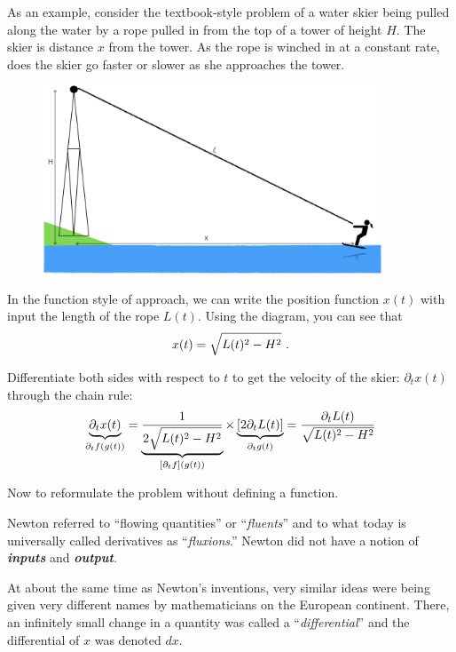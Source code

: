 \documentclass[
  letterpaper,
  DIV=11,
  numbers=noendperiod,
  oneside]{scrreprt}
\begin{document}
As an example, consider the textbook-style problem of a water skier
being pulled along the water by a rope pulled in from the top of a tower
of height \(H\). The skier is distance \(x\) from the tower. As the rope
is winched in at a constant rate, does the skier go faster or slower as
she approaches the tower.

\begin{figure}

{\centering \includegraphics[width=0.9\textwidth,height=\textheight]{Differentiation/www/water-skier.png}

}

\end{figure}

In the function style of approach, we can write the position function
\(x(t)\) with input the length of the rope \(L(t)\). Using the diagram,
you can see that \[x(t) = \sqrt{\strut L(t)^2 - H^2}\ .\]

Differentiate both sides with respect to \(t\) to get the velocity of
the skier: \(\partial_t x(t)\) through the chain rule:
\[\underbrace{\partial_t x(t)}_{\partial_t f(g(t))} = \underbrace{\frac{1}{2\sqrt{\strut L(t)^2 - H^2}}}_{\left[ \partial_t f \right](g(t)) } \times \underbrace{\left[2 \partial_t L(t)\right]}_{\partial_t g(t)} = \frac{\partial_t L(t)}{\strut\sqrt{L(t)^2 - H^2}}\]

Now to reformulate the problem without defining a function.

Newton referred to ``flowing quantities'' or ``\emph{fluents}'' and to
what today is universally called derivatives as ``\emph{fluxions}.''
Newton did not have a notion of \textbf{\emph{inputs}} and
\textbf{\emph{output}}.

At about the same time as Newton's inventions, very similar ideas were
being given very different names by mathematicians on the European
continent. There, an infinitely small change in a quantity was called a
``\emph{differential}'' and the differential of \(x\) was denoted
\(dx\).
\end{document}

